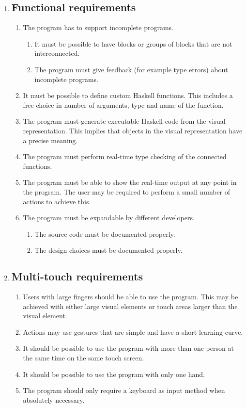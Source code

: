 \begin{enumerate}
\item \subsection*{Functional requirements}

\begin{enumerate}
	\item The program has to support incomplete programs.
	\begin{enumerate}
		\item It must be possible to have blocks or groups of blocks that are not interconnected.
		\item The program must give feedback (for example type errors) about incomplete programs.
	\end{enumerate}
	\item It must be possible to define custom Haskell functions. This includes a free choice in number of arguments, type and name of the function.
	\item The program must generate executable Haskell code from the visual representation. This implies that objects in the visual representation have a precise meaning.
	\item The program must perform real-time type checking of the connected functions.
	\item The program must be able to show the real-time output at any point in the program. The user may be required to perform a small number of actions to achieve this.
	\item The program must be expandable by different developers.
	\begin{enumerate}
		\item The source code must be documented properly.
		\item The design choices must be documented properly.
	\end{enumerate}
\end{enumerate}

\item \subsection*{Multi-touch requirements}

\begin{enumerate}
	\item Users with large fingers should be able to use the program. This may be achieved with either large visual elements or touch areas larger than the visual element.
	\item Actions may use gestures that are simple and have a short learning curve.
	\item It should be possible to use the program with more than one person at the same time on the same touch screen.
	\item It should be possible to use the program with only one hand.
	\item The program should only require a keyboard as input method when absolutely necessary.
\end{enumerate}

\end{enumerate}